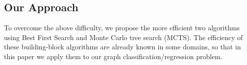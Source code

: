 \subsection{Our Approach}
\label{sec:ourapproach}
To overcome the above difficulty, 
we propose the more efficient two algorithms
using Best First Search and Monte Carlo tree search (MCTS).
The efficiency of these building-block algorithms are already known in some domains, 
so that in this paper we apply them to our graph classification/regression problem.
